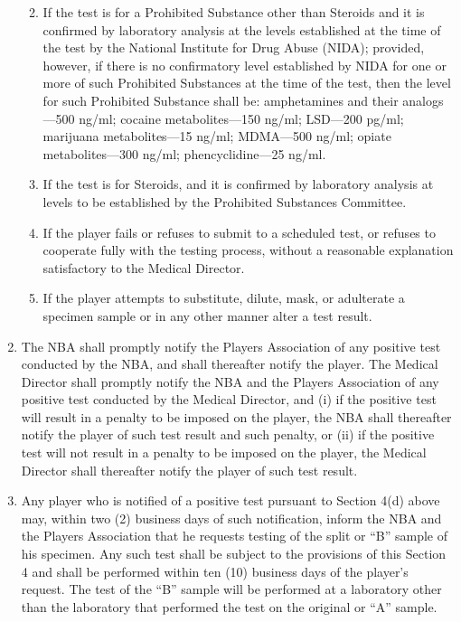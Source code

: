 \documentclass[
]{book}
\providecommand{\tightlist}{%
  \setlength{\itemsep}{0pt}\setlength{\parskip}{0pt}}
\begin{document}
\begin{enumerate}
  \begin{enumerate}
  \def\labelenumii{(\roman{enumii})}
  \tightlist
  \item
    If the test is for a Prohibited Substance other than Steroids and it is confirmed by laboratory analysis at the levels established at the time of the test by the National Institute for Drug Abuse (NIDA); provided, however, if there is no confirmatory level established by NIDA for one or more of such Prohibited Substances at the time of the test, then the level for such Prohibited Substance shall be: amphetamines and their analogs---500 ng/ml; cocaine metabolites---150 ng/ml; LSD---200 pg/ml; marijuana metabolites---15 ng/ml; MDMA---500 ng/ml; opiate metabolites---300 ng/ml; phencyclidine---25 ng/ml.
  \item
    If the test is for Steroids, and it is confirmed by laboratory analysis at levels to be established by the Prohibited Substances Committee.
  \item
    If the player fails or refuses to submit to a scheduled test, or refuses to cooperate fully with the testing process, without a reasonable explanation satisfactory to the Medical Director.
  \item
    If the player attempts to substitute, dilute, mask, or adulterate a specimen sample or in any other manner alter a test result.
  \end{enumerate}
\item
  The NBA shall promptly notify the Players Association of any positive test conducted by the NBA, and shall thereafter notify the player. The Medical Director shall promptly notify the NBA and the Players Association of any positive test conducted by the Medical Director, and (i) if the positive test will result in a penalty to be imposed on the player, the NBA shall thereafter notify the player of such test result and such penalty, or (ii) if the positive test will not result in a penalty to be imposed on the player, the Medical Director shall thereafter notify the player of such test result.
\item
  Any player who is notified of a positive test pursuant to Section 4(d) above may, within two (2) business days of such notification, inform the NBA and the Players Association that he requests testing of the split or ``B'' sample of his specimen. Any such test shall be subject to the provisions of this Section 4 and shall be performed within ten (10) business days of the player's request. The test of the ``B'' sample will be performed at a laboratory other than the laboratory that performed the test on the original or ``A'' sample.
\end{enumerate}
\end{document}

